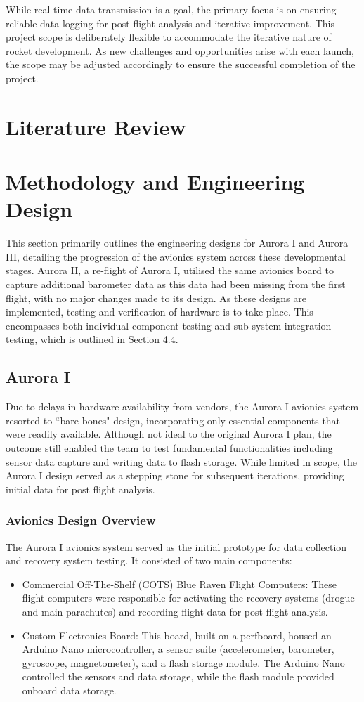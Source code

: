 While real-time data transmission is a goal, the primary focus is on ensuring reliable data logging for post-flight analysis and iterative improvement. This project scope is deliberately flexible to accommodate the iterative nature of rocket development. As new challenges and opportunities arise with each launch, the scope may be adjusted accordingly to ensure the successful completion of the project. 

\section{Literature Review}
\section{Methodology and Engineering Design}
This section primarily outlines the engineering designs for Aurora I and Aurora III, detailing the progression of the avionics system across these developmental stages. Aurora II, a re-flight of Aurora I, utilised the same avionics board to capture additional barometer data as this data had been missing from the first flight, with no major changes made to its design. As these designs are implemented, testing and verification of hardware is to take place. This encompasses both individual component testing and sub system integration testing, which is outlined in Section 4.4. 

\subsection{Aurora I }
Due to delays in hardware availability from vendors, the Aurora I avionics system resorted to “bare-bones" design, incorporating only essential components that were readily available. Although not ideal to the original Aurora I plan, the outcome still enabled the team to test fundamental functionalities including sensor data capture and writing data to flash storage. While limited in scope, the Aurora I design served as a stepping stone for subsequent iterations, providing initial data for post flight analysis. 

\subsubsection{Avionics Design Overview}
The Aurora I avionics system served as the initial prototype for data collection and recovery system testing. It consisted of two main components: 
\begin{itemize}
  \item Commercial Off-The-Shelf (COTS) Blue Raven Flight Computers: These flight computers were responsible for activating the recovery systems (drogue and main parachutes) and recording flight data for post-flight analysis. 
  \item Custom Electronics Board: This board, built on a perfboard, housed an Arduino Nano microcontroller, a sensor suite (accelerometer, barometer, gyroscope, magnetometer), and a flash storage module. The Arduino Nano controlled the sensors and data storage, while the flash module provided onboard data storage. 
\end{itemize}

